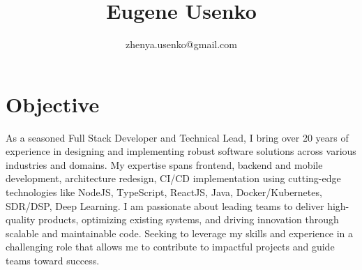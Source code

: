 \documentclass[10pt]{article}
\title{\bfseries Eugene Usenko}
\author{zhenya.usenko@gmail.com}
\date{}
\begin{document}
\maketitle
 
\section*{Objective}
As a seasoned Full Stack Developer and Technical Lead, I bring over 20 years of experience in designing and implementing robust software solutions across various industries and domains. My expertise spans frontend, backend and mobile development, architecture redesign, CI/CD implementation using cutting-edge technologies like NodeJS, TypeScript, ReactJS, Java, Docker/Kubernetes, SDR/DSP, Deep Learning. I am passionate about leading teams to deliver high-quality products, optimizing existing systems, and driving innovation through scalable and maintainable code. Seeking to leverage my skills and experience in a challenging role that allows me to contribute to impactful projects and guide teams toward success.
 
\end{document}
